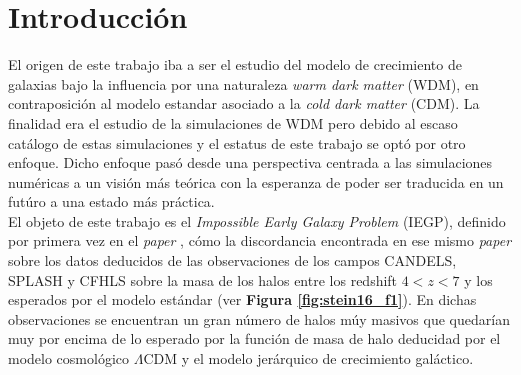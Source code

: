 
\chapter{Introducción} %

\label{introduction} %


\newcommand{\keyword}[1]{\textbf{#1}}
\newcommand{\tabhead}[1]{\textbf{#1}}
\newcommand{\code}[1]{\texttt{#1}}
\newcommand{\file}[1]{\texttt{\bfseries#1}}
\newcommand{\option}[1]{\texttt{\itshape#1}}
\newcommand{\lcdm}{$\Lambda$CDM }



El origen de este trabajo iba a ser el estudio del modelo de crecimiento de galaxias bajo la influencia por una naturaleza \textit{warm dark matter} (WDM), en contraposición al modelo estandar asociado a la \textit{cold dark matter} (CDM). La finalidad era el estudio de la simulaciones de WDM pero debido al escaso cat\'alogo de estas simulaciones y el estatus de este trabajo se opt\'o por otro enfoque. Dicho enfoque pas\'o desde una perspectiva centrada a las simulaciones num\'ericas a un visi\'on m\'as te\'orica con la esperanza de poder ser traducida en un fut\'uro a una estado m\'as pr\'actica.\\

El objeto de este trabajo es el \textit{Impossible Early Galaxy Problem} (IEGP), definido por primera vez en el \textit{paper} \cite{steinhardt2016impossibly}, c\'omo la discordancia encontrada en ese mismo \textit{paper} sobre los datos deducidos de las observaciones de los campos CANDELS, SPLASH y CFHLS sobre la masa de los halos entre los redshift $4<z<7$ y los esperados por el modelo est\'andar (ver \textbf{Figura \ref{fig:stein16_f1}}). En dichas observaciones se encuentran un gran n\'umero de halos m\'uy masivos que quedar\'ian muy por encima de lo esperado por la función de masa de halo deducidad por el modelo cosmol\'ogico \lcdm y el modelo jer\'arquico de crecimiento gal\'actico. 

